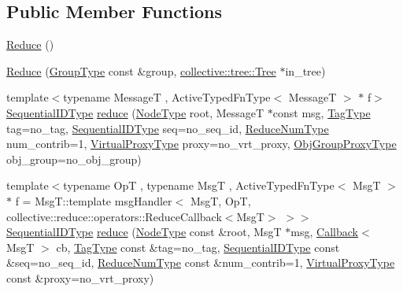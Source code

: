 \subsection*{Public Member Functions}
\begin{DoxyCompactItemize}
\item 
\hyperlink{structvt_1_1collective_1_1reduce_1_1_reduce_a1a3dc3704014f244b5344e320fee0c2e}{Reduce} ()
\item 
\hyperlink{structvt_1_1collective_1_1reduce_1_1_reduce_a223205c0c65b754e47731520ab3c79b6}{Reduce} (\hyperlink{namespacevt_a27b5e4411c9b6140c49100e050e2f743}{Group\+Type} const \&group, \hyperlink{structvt_1_1collective_1_1tree_1_1_tree}{collective\+::tree\+::\+Tree} $\ast$in\+\_\+tree)
\item 
{\footnotesize template$<$typename MessageT , Active\+Typed\+Fn\+Type$<$ Message\+T $>$ $\ast$ f$>$ }\\\hyperlink{namespacevt_a3063d4db3b879d6dd2c7b8d50995c7f6}{Sequential\+I\+D\+Type} \hyperlink{structvt_1_1collective_1_1reduce_1_1_reduce_a70c21400562e2a43e6d0cfa4a08602f7}{reduce} (\hyperlink{namespacevt_a866da9d0efc19c0a1ce79e9e492f47e2}{Node\+Type} root, MessageT $\ast$const msg, \hyperlink{namespacevt_a84ab281dae04a52a4b243d6bf62d0e52}{Tag\+Type} tag=no\+\_\+tag, \hyperlink{namespacevt_a3063d4db3b879d6dd2c7b8d50995c7f6}{Sequential\+I\+D\+Type} seq=no\+\_\+seq\+\_\+id, \hyperlink{structvt_1_1collective_1_1reduce_1_1_reduce_a6fd4d5e956ac5acd321e57c7dad5131f}{Reduce\+Num\+Type} num\+\_\+contrib=1, \hyperlink{namespacevt_a1b417dd5d684f045bb58a0ede70045ac}{Virtual\+Proxy\+Type} proxy=no\+\_\+vrt\+\_\+proxy, \hyperlink{namespacevt_ad7cae989df485fccca57f0792a880a8e}{Obj\+Group\+Proxy\+Type} obj\+\_\+group=no\+\_\+obj\+\_\+group)
\item 
{\footnotesize template$<$typename OpT , typename MsgT , Active\+Typed\+Fn\+Type$<$ Msg\+T $>$ $\ast$ f = Msg\+T\+::template msg\+Handler$<$      Msg\+T, Op\+T, collective\+::reduce\+::operators\+::\+Reduce\+Callback$<$\+Msg\+T$>$    $>$$>$ }\\\hyperlink{namespacevt_a3063d4db3b879d6dd2c7b8d50995c7f6}{Sequential\+I\+D\+Type} \hyperlink{structvt_1_1collective_1_1reduce_1_1_reduce_afc83acfdd53b377d632084a6c50dfb7b}{reduce} (\hyperlink{namespacevt_a866da9d0efc19c0a1ce79e9e492f47e2}{Node\+Type} const \&root, MsgT $\ast$msg, \hyperlink{namespacevt_a36db99df4c973d48b1118a293fff533f}{Callback}$<$ MsgT $>$ cb, \hyperlink{namespacevt_a84ab281dae04a52a4b243d6bf62d0e52}{Tag\+Type} const \&tag=no\+\_\+tag, \hyperlink{namespacevt_a3063d4db3b879d6dd2c7b8d50995c7f6}{Sequential\+I\+D\+Type} const \&seq=no\+\_\+seq\+\_\+id, \hyperlink{structvt_1_1collective_1_1reduce_1_1_reduce_a6fd4d5e956ac5acd321e57c7dad5131f}{Reduce\+Num\+Type} const \&num\+\_\+contrib=1, \hyperlink{namespacevt_a1b417dd5d684f045bb58a0ede70045ac}{Virtual\+Proxy\+Type} const \&proxy=no\+\_\+vrt\+\_\+proxy)

\end{DoxyCompactItemize}

